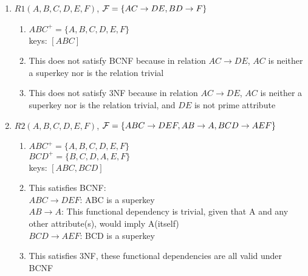 \documentclass[11pt]{article}
\begin{document}
\begin{enumerate}[label=\Alph*]

\item $R1(A,B,C,D,E,F)$, ${\cal F} = \{AC\rightarrow DE, BD\rightarrow F \}$
    \begin{enumerate}[label=\Alph*]
    \item $ABC^+ = \{A,B,C,D,E,F\}$ \\
    keys: $[ABC]$
    \item This does not satisfy BCNF because in relation $AC \rightarrow DE$, $AC$ is neither a superkey nor is the relation trivial
    \item This does not satisfy 3NF because in relation $AC \rightarrow DE$, $AC$ is neither a superkey nor is the relation trivial, and $DE$ is not prime attribute 
    \end{enumerate}
\item $R2(A,B,C,D,E,F)$, ${\cal F} = \{ABC\rightarrow DEF,
  AB\rightarrow A, BCD\rightarrow AEF \}$
    \begin{enumerate}[label=\Alph*]
    \item $ABC^+ = \{A,B,C,D,E,F\}$ \\
    $BCD^+ = \{B,C,D,A,E,F\}$ \\
    keys: $[ABC, BCD]$
    \item This satisfies BCNF:\\
    $ABC \rightarrow DEF$: ABC is a superkey \\
    $AB \rightarrow A$: This functional dependency is trivial, given that A and any other attribute(s), would imply A(itself) \\
    $BCD \rightarrow AEF$: BCD is a superkey
    \item This satisfies 3NF, these functional dependencies are all valid under BCNF
    \end{enumerate}


\end{enumerate}
\end{document}
